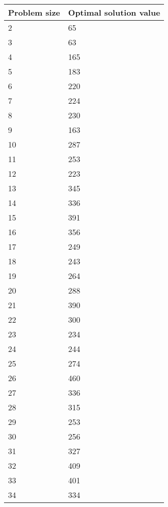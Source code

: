 \begin{tabular}{*{2}{C{65pt}}}
	\toprule
	Problem size & Optimal solution value\\
	 & 65\\
	3 & 63\\
	4 & 165\\
	5 & 183\\
	6 & 220\\
	7 & 224\\
	8 & 230\\
	9 & 163\\
	10 & 287\\
	11 & 253\\
	12 & 223\\
	13 & 345\\
	14 & 336\\
	15 & 391\\
	16 & 356\\
	17 & 249\\
	18 & 243\\
	19 & 264\\
	20 & 288\\
	21 & 390\\
	22 & 300\\
	23 & 234\\
	24 & 244\\
	25 & 274\\
	26 & 460\\
	27 & 336\\
	28 & 315\\
	29 & 253\\
	30 & 256\\
	31 & 327\\
	32 & 409\\
	33 & 401\\
	34 & 334\\
	\bottomrule
\end{tabular}